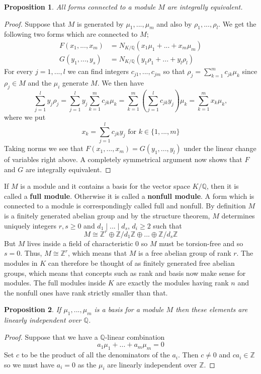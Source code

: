 \documentclass{article}
\newtheorem{proposition}{Proposition}[section]
\newcommand{\mbb}[1]{\mathbb{#1}}
\numberwithin{equation}{section}
\begin{document}
\begin{proposition}\label{fact: Forms connected to module are equivalent}
	All forms connected to a module $M$ are integrally equivalent.
\end{proposition}
\begin{proof}
	Suppose that $M$ is generated by $\mu_1, ..., \mu_m$ and also by $\rho_1, ...,\rho_l$. We get the following two forms which are connected to $M$;
	\begin{align*}
    	F(x_1, ..., x_m) &= N_{K/\mbb Q}(x_1 \mu_1 + ... + x_m \mu_m) \\ G(y_1, ..., y_s) &= N_{K/\mbb Q}(y_1 \rho_1 + ... + y_l \rho_l)
	\end{align*}
	For every $j = 1, ..., l$ we can find integers $c_{j1}, ..., c_{jm}$ so that
	$\rho_j = \sum_{k=1}^m c_{jk} \mu_k$ since $\rho_j \in M$ and the $\mu_i$ generate $M$. We then have
	$$\sum_{j=1}^l y_j \rho_j = \sum_{j=1}^l y_j \sum_{k=1}^m c_{jk} \mu_k = \sum_{k=1}^m (\sum_{j=1}^l c_{jk} y_j) \mu_k = \sum_{k=1}^m x_k \mu_k,$$
	where we put
	\begin{equation*}
    	x_k = \sum_{j=1}^l c_{jk} y_j \text{ for } k \in \{1, ..., m\}
	\end{equation*}
	Taking norms we see that $F(x_1, ..., x_m) = G(y_1, ..., y_l)$ under the linear change of variables right above. A completely symmetrical argument now shows that $F$ and $G$ are integrally equivalent.
\end{proof}
If $M$ is a module and it contains a basis for the vector space $K / \mbb{Q}$, then it is called a \textbf{full module}. Otherwise it is called a \textbf{nonfull module}. A form which is connected to a module is correspondingly called full and nonfull. By definition $M$ is a finitely generated abelian group and by the structure theorem, $M$ determines uniquely integers $r,s \geq 0$ and $d_1 \mid ... \mid d_s$, $d_i \geq 2$ such that
$$M \cong \mbb{Z}^r \oplus \mbb{Z}/d_1\mbb{Z} \oplus ... \oplus \mbb{Z}/d_s\mbb{Z} $$
But $M$ lives inside a field of characteristic 0 so $M$ must be torsion-free and so $s = 0$. Thus, $M \cong \mbb{Z}^r$, which means that $M$ is a free abelian group of rank $r$. The modules in $K$ can therefore be thought of as finitely generated free abelian groups, which means that concepts such as rank and basis now make sense for modules. The full modules inside $K$ are exactly the modules having rank $n$ and the nonfull ones have rank strictly smaller than that.

\begin{proposition}\label{lem: Basis for module is linearly independent over Q}
	If $\mu_1, ..., \mu_m$ is a basis for a module $M$ then these elements are linearly independent over $\mbb Q$.
\end{proposition}
\begin{proof}
	Suppose that we have a $\mbb Q$-linear combination
	$$a_1 \mu_1 + ... + a_m \mu_m = 0$$
	Set $c$ to be the product of all the denominators of the $a_i$. Then $c \neq 0$ and $ca_i \in \mbb Z$ so we must have $a_i = 0$ as the $\mu_i$ are linearly independent over $\mbb Z$.
\end{proof}
\end{document}
